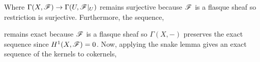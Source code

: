 \documentclass[12pt]{article}
\begin{document}
\begin{enumerate}
\begin{center}
\end{center}
Where $\Gamma(X, \mathscr{F}) \to \Gamma(U, \mathscr{F} |_U)$ remains surjective because $\mathscr{F}$ is a flasque sheaf so restriction is surjective. Furthermore, the sequence,
\begin{center}
\end{center} 
remains exact because $\mathscr{F}$ is a flasque sheaf so $\Gamma(X, -)$ preserves the exact sequence since $H^1(X, \mathscr{F}) = 0$. Now, applying the snake lemma gives an exact sequence of the kernels to cokernels,
\begin{center}
\end{center}



\end{enumerate}
\end{document}
